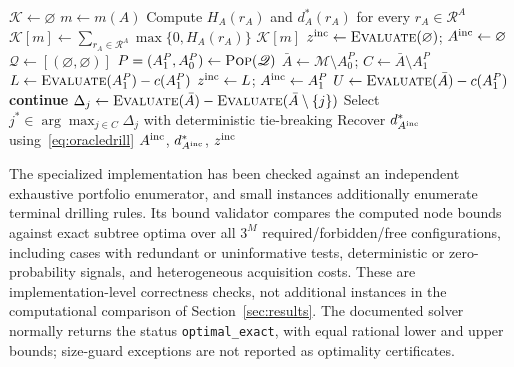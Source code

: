 \documentclass[11pt,a4paper]{article}
\newcommand{\calM}{\mathcal{M}}
\newcommand{\calR}{\mathcal{R}}
\begin{document}
\begin{algorithm}[htbp]
\caption{Exact IR-B\&B for the extended oil wildcatter problem}\label{alg:irbb}
\small
\begin{algorithmic}[1]
\State $\mathscr K\gets\varnothing$ 
    \State $m\gets m(A)$
      \State Compute $H_A(r_A)$ and $d_A^*(r_A)$ for every $r_A\in\calR^A$
      \State $\mathscr K[m]\gets\sum_{r_A\in\calR^A}\max\{0,H_A(r_A)\}$
    \EndIf
    \State \Return $\mathscr K[m]$
\EndFunction
\State $z^{\rm inc}\gets\Call{Evaluate}{\varnothing}$; $A^{\rm inc}\gets\varnothing$
\State $\mathscr Q\gets[(\varnothing,\varnothing)]$ 
    \State $P=(A_1^P,A_0^P)\gets\Call{Pop}{\mathscr Q}$
    \State $\bar A\gets\calM\setminus A_0^P$; $C\gets\bar A\setminus A_1^P$
    \State $L\gets\Call{Evaluate}{A_1^P}-c(A_1^P)$
        \State $z^{\rm inc}\gets L$; $A^{\rm inc}\gets A_1^P$
    \EndIf
    \State $U\gets\Call{Evaluate}{\bar A}-c(A_1^P)$
     \State \textbf{continue}  \EndIf
        \State $\Delta_j\gets\Call{Evaluate}{\bar A}-\Call{Evaluate}{\bar A\setminus\{j\}}$
    \EndFor
    \State Select $j^*\in\arg\max_{j\in C}\Delta_j$ with deterministic tie-breaking
    \State {} 
    \State {} 
\EndWhile
\State Recover $d^*_{A^{\rm inc}}$ using~\eqref{eq:oracledrill}
\State \Return $A^{\rm inc}$, $d^*_{A^{\rm inc}}$, $z^{\rm inc}$
\end{algorithmic}
\end{algorithm}

The specialized implementation has been checked against an independent exhaustive portfolio enumerator, and small instances additionally enumerate terminal drilling rules. Its bound validator compares the computed node bounds against exact subtree optima over all $3^M$ required/forbidden/free configurations, including cases with redundant or uninformative tests, deterministic or zero-probability signals, and heterogeneous acquisition costs. These are implementation-level correctness checks, not additional instances in the computational comparison of Section~\ref{sec:results}. The documented solver normally returns the status \texttt{optimal\_exact}, with equal rational lower and upper bounds; size-guard exceptions are not reported as optimality certificates.
\end{document}
